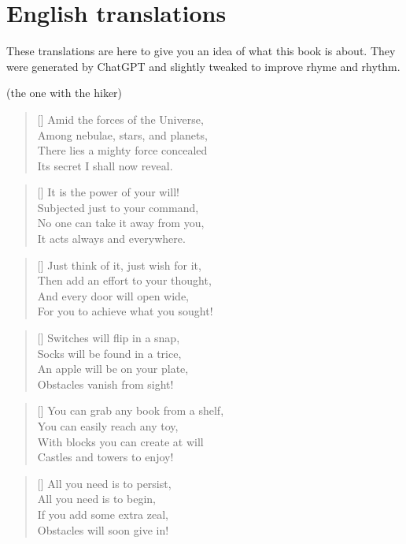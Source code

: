 \section*{English translations}
These translations are here to give you an idea of what this book is about. They were generated by ChatGPT and slightly tweaked to improve rhyme and rhythm.


\PlainPoemTitle
{}
\vspace{-5mm}
\begin{center}
	(the one with the hiker)
\end{center}

\begin{multicols}{2}
	
	
	\begin{verse}[\versewidth]
		Amid the forces of the Universe,\\
		Among nebulae, stars, and planets,\\
		There lies a mighty force concealed\\
		Its secret I shall now reveal.
	\end{verse}
	
	\begin{verse}[\versewidth]
		It is the power of your will!\\
		Subjected just to your command,\\
		No one can take it away from you,\\
		It acts always and everywhere.
	\end{verse}
	
	\begin{verse}[\versewidth]
		Just think of it, just wish for it,\\
		Then add an effort to your thought,\\
		And every door will open wide,\\
		For you to achieve what you sought!
	\end{verse}
	
	
	\begin{verse}[\versewidth]
		Switches will flip in a snap,\\
		Socks will be found in a trice,\\
		An apple will be on your plate,\\
		Obstacles vanish from sight!
	\end{verse}
	
	\begin{verse}[\versewidth]
		You can grab any book from a shelf,\\
		You can easily reach any toy,\\
		With blocks you can create at will\\
		Castles and towers to enjoy!
	\end{verse}
	
	\begin{verse}[\versewidth]
		All you need is to persist,\\
		All you need is to begin,\\
		If you add some extra zeal,\\
		Obstacles will soon give in!
	\end{verse}
	
	
\end{multicols}
